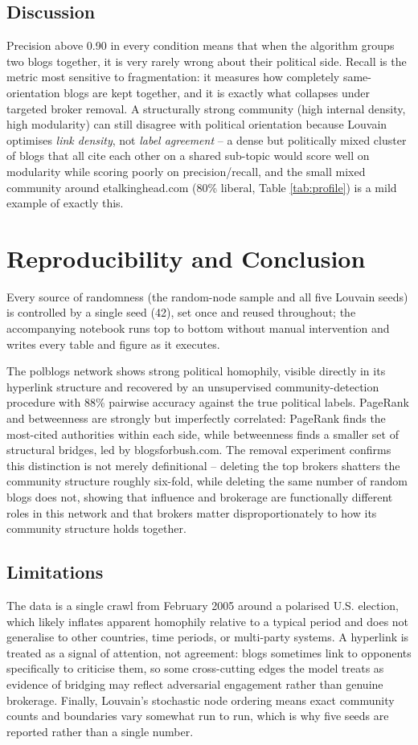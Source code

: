 \documentclass[10pt,conference]{IEEEtran}
\begin{document}
\subsection{Discussion}
Precision above 0.90 in every condition means that when the algorithm groups two blogs together, it
is very rarely wrong about their political side. Recall is the metric most sensitive to
fragmentation: it measures how completely same-orientation blogs are kept together, and it is
exactly what collapses under targeted broker removal. A structurally strong community (high internal
density, high modularity) can still disagree with political orientation because Louvain optimises
\emph{link density}, not \emph{label agreement} -- a dense but politically mixed cluster of blogs
that all cite each other on a shared sub-topic would score well on modularity while scoring poorly on
precision/recall, and the small mixed community around etalkinghead.com (80\% liberal, Table
\ref{tab:profile}) is a mild example of exactly this.

\section{Reproducibility and Conclusion}
Every source of randomness (the random-node sample and all five Louvain seeds) is controlled by a
single seed (42), set once and reused throughout; the accompanying notebook runs top to bottom
without manual intervention and writes every table and figure as it executes.

The polblogs network shows strong political homophily, visible directly in its hyperlink structure
and recovered by an unsupervised community-detection procedure with 88\% pairwise accuracy against
the true political labels. PageRank and betweenness are strongly but imperfectly correlated: PageRank
finds the most-cited authorities within each side, while betweenness finds a smaller set of
structural bridges, led by blogsforbush.com. The removal experiment confirms this distinction is not
merely definitional -- deleting the top brokers shatters the community structure roughly six-fold,
while deleting the same number of random blogs does not, showing that influence and brokerage are
functionally different roles in this network and that brokers matter disproportionately to how its
community structure holds together.

\subsection*{Limitations}
The data is a single crawl from February 2005 around a polarised U.S. election, which likely
inflates apparent homophily relative to a typical period and does not generalise to other countries,
time periods, or multi-party systems. A hyperlink is treated as a signal of attention, not agreement:
blogs sometimes link to opponents specifically to criticise them, so some cross-cutting edges the
model treats as evidence of bridging may reflect adversarial engagement rather than genuine
brokerage. Finally, Louvain's stochastic node ordering means exact community counts and boundaries
vary somewhat run to run, which is why five seeds are reported rather than a single number.
\end{document}
